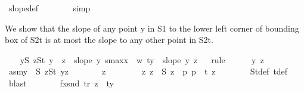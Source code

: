 \begin{isabellebody}
\ slope{\isacharunderscore}{\kern0pt}def\isanewline
\ \ \ \ \ \ \isamarkupfalse%
\ simp\isanewline
\ \ \isamarkupfalse%
%
\begin{isamarkuptext}%
We show that the slope of any point y in S1 to the lower left corner of bounding box of S2t is at most the slope to any other point in S2t.%
\end{isamarkuptext}\isamarkuptrue%
\ \ \isamarkupfalse%
\ {\isachardoublequoteopen}{\isasymforall}y{\isasymin}S{}{\isachardot}{\kern0pt}\ {\isasymforall}z{\isasymin}S{}t{\isachardot}{\kern0pt}\ y\ {\isacharless}{\kern0pt}\ z\ {\isasymlongrightarrow}\ slope\ y\ {\isacharparenleft}{\kern0pt}s{}{\isacharunderscore}{\kern0pt}maxx{\isacharplus}{\kern0pt}{}\ {\isacharplus}{\kern0pt}\ w{}{\isacharcomma}{\kern0pt}\ ty{}{\isacharplus}{\kern0pt}{}{\isacharparenright}{\kern0pt}\ {\isasymle}\ slope\ y\ z{\isachardoublequoteclose}\isanewline
\ \ \isamarkupfalse%
{\isacharparenleft}{\kern0pt}rule{\isacharplus}{\kern0pt}{\isacharparenright}{\kern0pt}\isanewline
\ \ \ \ \isamarkupfalse%
\ y\ z\ \isamarkupfalse%
\ asm{\isacharcolon}{\kern0pt}{\isachardoublequoteopen}y\ {\isasymin}\ S{}{\isachardoublequoteclose}\ {\isachardoublequoteopen}z{\isasymin}S{}t{\isachardoublequoteclose}\ {\isachardoublequoteopen}y{\isacharless}{\kern0pt}z{\isachardoublequoteclose}\isanewline
\ \ \ \ \isamarkupfalse%
\ \isamarkupfalse%
\ z{}\ \isanewline
\ \ \ \ \ \ \ z{}{\isacharcolon}{\kern0pt}\ {\isachardoublequoteopen}z{}\ {\isasymin}\ S{}{\isachardoublequoteclose}\ {\isachardoublequoteopen}z\ {\isacharequal}{\kern0pt}\ {\isacharparenleft}{\kern0pt}{\isasymlambda}p{\isachardot}{\kern0pt}\ p\ {\isacharplus}{\kern0pt}\ t{\isacharparenright}{\kern0pt}\ z{}{\isachardoublequoteclose}\isanewline
\ \ \ \ \ \ \isamarkupfalse%
\ S{}t{\isacharunderscore}{\kern0pt}def\ t{\isacharunderscore}{\kern0pt}def\ \isamarkupfalse%
\ blast\isanewline
\ \isanewline
\ \ \ \ \isamarkupfalse%
\ fx{\isacharcolon}{\kern0pt}{\isachardoublequoteopen}snd\ {\isacharparenleft}{\kern0pt}{\isacharquery}{\kern0pt}tr\ z{}{\isacharparenright}{\kern0pt}\ {\isasymge}\ ty\ {\isacharplus}{\kern0pt}\ {}{\isachardoublequoteclose}\ \isamarkupfalse%

\end{isabellebody}

